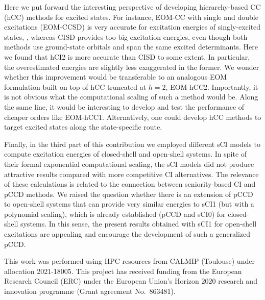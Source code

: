 \documentclass[aip,jcp,reprint,noshowkeys,superscriptaddress]{revtex4-1}
\begin{document}
Here we put forward the interesting perspective of developing hierarchy-based CC (hCC) methods for excited states.
For instance, EOM-CC with single and double excitations (EOM-CCSD) \cite{} is very accurate for excitation energies of singly-excited states, \cite{Loos_2018,Loos_2020,Loos_2020a},
whereas CISD provides too big excitation energies, 
even though both methods use ground-state orbitals and span the same excited determinants.
Here we found that hCI2 is more accurate than CISD to some extent. In particular, the overestimated energies are slightly less exaggerated in the former.
We wonder whether this improvement would be transferable to an analogous EOM formulation built on top of hCC truncated at $h=2$, EOM-hCC2.
Importantly, it is not obvious what the computational scaling of such a method would be.
Along the same line, it would be interesting to develop and test the performance of cheaper orders like EOM-hCC1.
Alternatively, one could develop hCC methods to target excited states along the state-specific route.


Finally, in the third part of this contribution we employed different sCI models to compute excitation energies of closed-shell and open-shell systems.
In spite of their formal exponential computational scaling, the sCI models did not produce attractive results compared with more competitive CI alternatives.
The relevance of these calculations is related to the connection between seniority-based CI and pCCD methods.
We raised the question whether there is an extension of pCCD to open-shell systems that can provide very similar energies to sCI1 (but with a polynomial scaling),
which is already established (pCCD and sCI0) for closed-shell systems. \cite{Kossoski_2021}
In this sense, the present results obtained with sCI1 for open-shell excitations are appealing and encourage the development of such a generalized pCCD.

\begin{acknowledgements}
This work was performed using HPC resources from CALMIP (Toulouse) under allocation 2021-18005.
This project has received funding from the European Research Council (ERC) under the European Union's Horizon 2020 research and innovation programme (Grant agreement No.~863481).
\end{acknowledgements}
\end{document}
